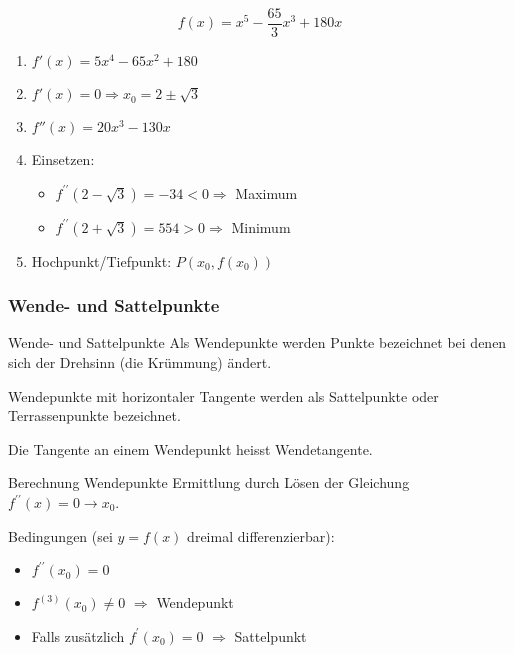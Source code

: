 \begin{example}
    $$f(x)=x^{5}-\frac{65}{3} x^{3}+180 x$$

    \begin{enumerate}
        \item $f'(x)=5 x^{4}-65 x^{2}+180$
        \item $f'(x)=0 \Rightarrow x_{0}=2 \pm \sqrt{3}$
        \item $f''(x)=20 x^{3}-130 x$
        \item Einsetzen:
            \begin{itemize}
              \item $f^{\prime \prime}(2-\sqrt{3})=-34 < 0 \Rightarrow$ Maximum
              \item $f^{\prime \prime}(2+\sqrt{3})=554 > 0 \Rightarrow$ Minimum
            \end{itemize}
        \item Hochpunkt/Tiefpunkt: $P\left(x_{0}, f(x_0)\right)$
    \end{enumerate}
\end{example}

\subsubsection{Wende- und Sattelpunkte}

\begin{definition}{Wende- und Sattelpunkte}
    Als Wendepunkte werden Punkte bezeichnet bei denen sich der Drehsinn (die Krümmung) ändert.

    Wendepunkte mit horizontaler Tangente werden als Sattelpunkte oder Terrassenpunkte bezeichnet.

    Die Tangente an einem Wendepunkt heisst Wendetangente.
\end{definition}

\begin{KR}{Berechnung Wendepunkte}
    Ermittlung durch Lösen der Gleichung $f^{\prime \prime}(x)=0 \rightarrow x_{0}$.

    Bedingungen (sei $y=f(x)$ dreimal differenzierbar):
    \begin{itemize}
      \item $f^{\prime \prime}\left(x_{0}\right)=0$
      \item $f^{(3)}\left(x_{0}\right) \neq 0$ $\Rightarrow$ Wendepunkt
      \item Falls zusätzlich $f^{\prime}\left(x_{0}\right)=0$ $\Rightarrow$ Sattelpunkt
    \end{itemize}
\end{KR}

